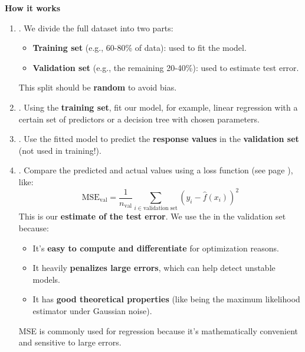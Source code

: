 \highspace
\begin{flushleft}
    \textcolor{Green3}{ \textbf{How it works}}
\end{flushleft}
\begin{enumerate}
    \item {}. We divide the full dataset into two parts:
    \begin{itemize}
        \item \textbf{Training set} (e.g., 60-80\% of data): used to fit the model.
        \item \textbf{Validation set} (e.g., the remaining 20-40\%): used to estimate test error.
    \end{itemize}
    This split should be \textbf{random} to avoid bias.

    \item {}. Using the \textbf{training set}, fit our model, for example, linear regression with a certain set of predictors or a decision tree with chosen parameters.
    
    \item {}. Use the fitted model to predict the \textbf{response values} in the \textbf{validation set} (not used in training!).
    
    \item {}. Compare the predicted and actual values using a loss function (see page \pageref{def: Loss Function}), like:
    \begin{equation}\label{eq: Mean Squared Error}
        \text{MSE}_\text{val} = \frac{1}{n_\text{val}} \sum_{i \in \text{validation set}} (y_i - \hat{f}(x_i))^2
    \end{equation}
    This is our \textbf{estimate of the test error}. We use the  in the validation set because:
    \begin{itemize}
        \item It's \textbf{easy to compute and differentiate} for optimization reasons.
        \item It heavily \textbf{penalizes large errors}, which can help detect unstable models.
        \item It has \textbf{good theoretical properties} (like being the maximum likelihood estimator under Gaussian noise).
    \end{itemize}
    MSE is commonly used for regression because it's mathematically convenient and sensitive to large errors.
\end{enumerate}

